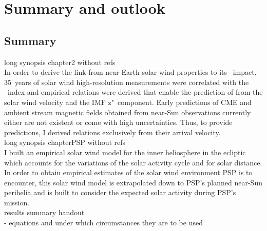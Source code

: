 
\chapter{Summary and outlook}
\label{chap:summary}


% 

\section{Summary}

long synopsis chapter2 without refs\\

In order to derive the link from near-Earth solar wind properties to its \Kp{}~impact, 35~years of solar wind high-resolution measurements were correlated with the \Kp~index and empirical relations were derived that enable the prediction of \Kp{} from the solar wind velocity and the IMF z"~component. Early predictions of CME and ambient stream magnetic fields obtained from near-Sun observations currently either are not existent or come with high uncertainties. Thus, to provide \Kp{} predictions, I derived relations exclusively from their arrival velocity.\\


long synopsis chapterPSP without refs\\

I built an empirical solar wind model for the inner heliosphere in the ecliptic which accounts for the variations of the solar activity cycle and for solar distance. In order to obtain empirical estimates of the solar wind environment PSP is to encounter, this solar wind model is extrapolated down to PSP's planned near-Sun perihelia and is built to consider the expected solar activity during PSP's mission.\\

results summary handout\\
- equations and under which circumstances they are to be used\\


